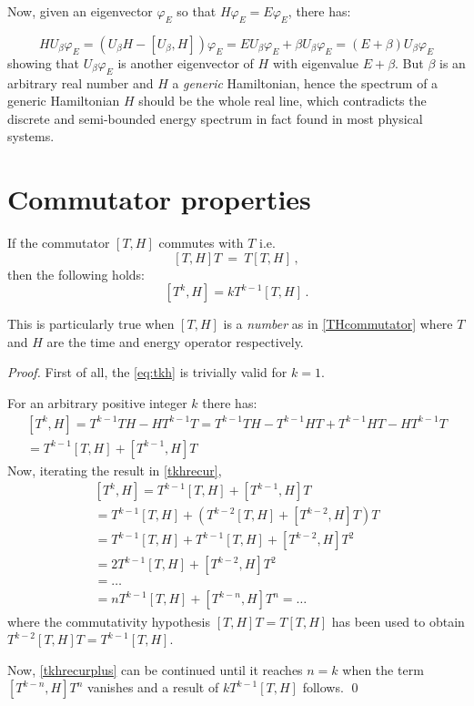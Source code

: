 \documentclass[a4paper,12pt]{article}
\begin{document}
Now, given an eigenvector $\varphi_{E}$ so that $H\varphi_{E}=E\varphi_{E}$, there has:

$$
HU_{\beta}\varphi_{E} = (U_{\beta}H - [U_{\beta}, H])\varphi_{E} =
EU_{\beta}\varphi_{E} + \beta U_{\beta}\varphi_{E} = (E+\beta)U_{\beta}\varphi_{E}
$$
showing that $U_{\beta}\varphi_{E}$ is another eigenvector of $H$ with eigenvalue
$E+\beta$. But $\beta$ is an arbitrary real number and $H$ a \emph{generic} Hamiltonian,
hence the spectrum of a generic Hamiltonian $H$ should
be the whole real line, which contradicts the discrete and semi-bounded energy spectrum
in fact found in most physical systems.

\appendix\section{Commutator properties}\label{CommProp}
\begin{lemma}
If the commutator $[T, H]$ commutes with $T$ i.e.
$$[T, H]T~=~T[T, H]\,,$$ then the following holds:
\begin{equation}\label{eq:tkh}
[T^k, H] = kT^{k-1}[T, H]\,.
\end{equation}
\end{lemma}
This is particularly true when $[T, H]$ is a \emph{number} as in \ref{THcommutator} where
$T$ and $H$ are the time and energy operator respectively.
\begin{proof}
First of all, the \ref{eq:tkh} is trivially valid for $k = 1$.

For an arbitrary positive integer $k$ there has:
\begin{multline}\label{tkhrecur}
[T^k, H] = T^{k-1}TH - HT^{k-1}T = T^{k-1}TH - T^{k-1}HT + T^{k-1}HT - HT^{k-1}T \\
    = T^{k-1}[T, H] + [T^{k-1}, H]T
\end{multline}
Now, iterating the result in \ref{tkhrecur},
\begin{multline}\label{tkhrecurplus}
[T^k, H] = T^{k-1}[T, H] + [T^{k-1}, H]T \\
= T^{k-1}[T, H] + (T^{k-2}[T, H] + [T^{k-2}, H]T)T \\
= T^{k-1}[T, H] +  T^{k-1}[T, H] + [T^{k-2}, H]T^2 \\
= 2T^{k-1}[T, H] + [T^{k-2}, H]T^2 \\
= \hdots \\
= nT^{k-1}[T, H] + [T^{k-n}, H]T^n = \hdots
\end{multline}
where the commutativity hypothesis $[T, H]T = T[T, H]$ has been used to obtain $T^{k-2}[T, H]T = T^{k-1}[T, H]$.

Now, \ref{tkhrecurplus} can be continued until it reaches $n=k$ when the term
$[T^{k-n}, H]T^n$ vanishes and a result of $kT^{k-1}[T, H]$ follows. \qed
\end{proof}



\end{document}
